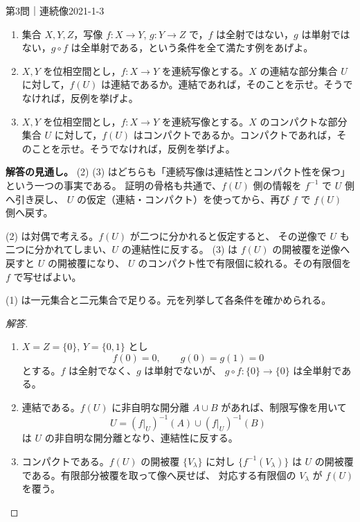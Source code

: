 \begin{problem}{第3問｜連続像}{2021-1-3}
\begin{enumerate}
  \item[(1)] 集合 $X,Y,Z$，写像 $f:X\to Y$, $g:Y\to Z$ で，$f$ は全射ではない，$g$ は単射ではない，$g\circ f$ は全単射である，という条件を全て満たす例をあげよ。
  \item[(2)] $X,Y$ を位相空間とし，$f:X\to Y$ を連続写像とする。$X$ の連結な部分集合 $U$ に対して，$f(U)$ は連結であるか。連結であれば，そのことを示せ。そうでなければ，反例を挙げよ。
  \item[(3)] $X,Y$ を位相空間とし，$f:X\to Y$ を連続写像とする。$X$ のコンパクトな部分集合 $U$ に対して，$f(U)$ はコンパクトであるか。コンパクトであれば，そのことを示せ。そうでなければ，反例を挙げよ。
\end{enumerate}
\end{problem}
\begin{memo*}
\textbf{解答の見通し。}
(2) (3) はどちらも「連続写像は連結性とコンパクト性を保つ」という一つの事実である。
証明の骨格も共通で、$f(U)$ 側の情報を $f^{-1}$ で $U$ 側へ引き戻し、
$U$ の仮定（連結・コンパクト）を使ってから、再び $f$ で $f(U)$ 側へ戻す。

(2) は対偶で考える。$f(U)$ が二つに分かれると仮定すると、
その逆像で $U$ も二つに分かれてしまい、$U$ の連結性に反する。
(3) は $f(U)$ の開被覆を逆像へ戻すと $U$ の開被覆になり、
$U$ のコンパクト性で有限個に絞れる。その有限個を $f$ で写せばよい。

(1) は一元集合と二元集合で足りる。元を列挙して各条件を確かめられる。
\end{memo*}
\begin{proof}[解答]
\begin{enumerate}
  \item[(1)] $X=Z=\{0\}$, $Y=\{0,1\}$ とし
  \[
  f(0)=0,\qquad g(0)=g(1)=0
  \]
  とする。$f$ は全射でなく、$g$ は単射でないが、
  $g\circ f:\{0\}\to\{0\}$ は全単射である。

  \item[(2)] 連結である。$f(U)$ に非自明な開分離 $A\cup B$ があれば、制限写像を用いて
  \[
  U=(f|_U)^{-1}(A)\cup(f|_U)^{-1}(B)
  \]
  は $U$ の非自明な開分離となり、連結性に反する。

  \item[(3)] コンパクトである。$f(U)$ の開被覆 $\{V_\lambda\}$ に対し
  $\{f^{-1}(V_\lambda)\}$ は $U$ の開被覆である。有限部分被覆を取って像へ戻せば、
  対応する有限個の $V_\lambda$ が $f(U)$ を覆う。
\end{enumerate}
\end{proof}

